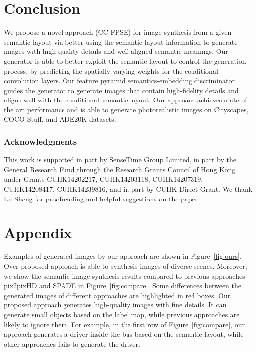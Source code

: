 \documentclass{article}
\begin{document}
\section{Conclusion}
We propose a novel approach (CC-FPSE) for image synthesis from a given semantic layout via better using the semantic layout information to generate images with high-quality details and well aligned semantic meanings.
Our generator is able to better exploit the semantic layout to control the generation process, by predicting the spatially-varying weights for the conditional convolution layers.
Our feature pyramid semantics-embedding discriminator guides the generator to generate images that contain high-fidelity details and aligns well with the conditional semantic layout.
Our approach achieves state-of-the art performance and is able to generate photorealistic images on Cityscapes, COCO-Stuff, and ADE20K datasets.

\newpage
\subsubsection*{Acknowledgments}
This work is supported in part by SenseTime Group Limited, in part by the General Research Fund through the Research Grants Council of Hong Kong under Grants CUHK14202217, CUHK14203118, CUHK14207319, CUHK14208417, CUHK14239816, and in part by CUHK Direct Grant. We thank Lu Sheng for proofreading and helpful suggestions on the paper.



\small



\normalsize

\section{Appendix}

Examples of generated images by our approach are shown in Figure~\ref{fig:ours}. Over proposed approach is able to synthesis images of diverse scenes.
Moreover, we show the semantic image synthesis results compared to previous approaches pix2pixHD and SPADE in Figure~\ref{fig:compare}.
Some differences between the generated images of different approaches are highlighted in red boxes.
Our proposed approach generates high-quality images with fine details. 
It can generate small objects based on the label map, while previous approaches are likely to ignore them. 
For example, in the first row of Figure~\ref{fig:compare}, our approach generates a driver inside the bus based on the semantic layout, while other approaches fails to generate the driver.
\end{document}
